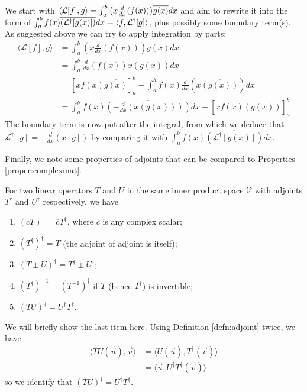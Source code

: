 \begin{solution}
We start with $\langle \mathcal{L}[f], g \rangle = \smash{\int_a^b \left(x\frac{d}{dx}(f(x))\right)} \overline{g(x)} dx$ and aim to rewrite it into the form of $ \smash{\int_a^b f(x)\overline{(\mathcal{L^\dag}[g(x)])}} dx = \langle f, \mathcal{L}^\dag[g] \rangle$, plus possibly some boundary term(s). As suggested above we can try to apply integration by parts:
\begin{align*}
\langle \mathcal{L}[f], g \rangle &=  \int_a^b \left(x\frac{d}{dx}(f(x))\right) \overline{g(x)} dx \\  
&= \int_a^b \frac{d}{dx}(f(x)) x\overline{(g(x))} dx \\
&= [xf(x)\overline{g(x)}]_a^b - \int_a^b f(x)\frac{d}{dx}(x\overline{(g(x))}) dx \\
&= \int_a^b f(x)\overline{\left(-\frac{d}{dx}(x(g(x)))\right)} dx + [xf(x)\overline{(g(x))}]_a^b
\end{align*}
The boundary term is now put after the integral, from which we deduce that $\mathcal{L}^\dag[g] = -\frac{d}{dx}(x[g])$ by comparing it with $\int_a^b f(x) \overline{(\mathcal{L^\dag}[g(x)])} dx$.
\end{solution}
Finally, we note some properties of adjoints that can be compared to Properties \ref{proper:complexmat}.
\begin{proper}
\label{proper:adjoints}
For two linear operators $T$ and $U$ in the same inner product space $\mathcal{V}$ with adjoints $T^\dag$ and $U^\dag$ respectively, we have
\begin{enumerate}
\item $(cT)^\dag = \overline{c}T^\dag$, where $c$ is any complex scalar;
\item $(T^\dag)^\dag = T$ (the adjoint of adjoint is itself);
\item $(T \pm U)^\dag = T^\dag \pm U^\dag$;
\item $(T^\dag)^{-1} = (T^{-1})^\dag$ if $T$ (hence $T^\dag$) is invertible;
\item $(TU)^\dag = U^\dag T^\dag$.
\end{enumerate}
\end{proper}
We will briefly show the last item here. Using Definition \ref{defn:adjoint} twice, we have
\begin{align*}
\langle TU(\vec{u}), \vec{v} \rangle &= \langle U(\vec{u}), T^\dag(\vec{v}) \rangle \\
&= \langle \vec{u}, U^\dag T^\dag(\vec{v}) \rangle
\end{align*}
so we identify that $(TU)^\dag = U^\dag T^\dag$.

